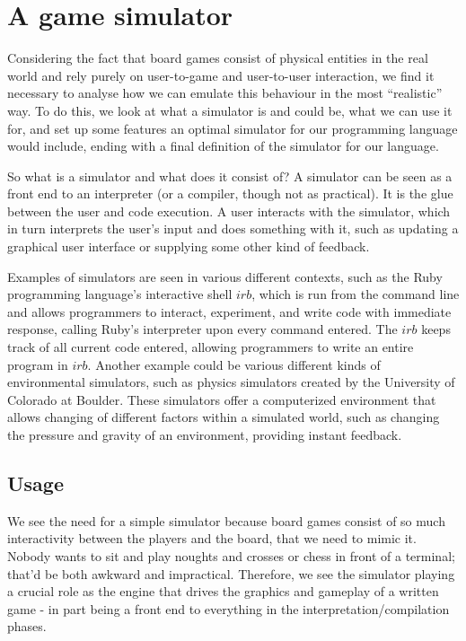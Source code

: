 \section{A game simulator}
\label{sec:simulator}
Considering the fact that board games consist of physical entities in the real
world and rely purely on user-to-game and user-to-user interaction, we find it
necessary to analyse how we can emulate this behaviour in the most ``realistic''
way. To do this, we look at what a simulator is and could be, what we can use it
for, and set up some features an optimal simulator for our programming language
would include, ending with a final definition of the simulator for our language.

So what is a simulator and what does it consist of? A simulator can be seen as a
front end to an interpreter (or a compiler, though not as practical). It is the
glue between the user and code execution. A user interacts with the simulator,
which in turn interprets the user's input and does something with it, such as
updating a graphical user interface or supplying some other kind of feedback.

Examples of simulators are seen in various different contexts, such as the
Ruby\cite{rubyLang} programming language's interactive shell $irb$, which is run
from the command line and allows programmers to interact, experiment, and write
code with immediate response, calling Ruby's interpreter upon every command
entered. The $irb$ keeps track of all current code entered, allowing programmers
to write an entire program in $irb$. Another example could be various different
kinds of environmental simulators, such as physics simulators created by the
University of Colorado at Boulder\cite{colSim}. These simulators offer a
computerized environment that allows changing of different factors within a
simulated world, such as changing the pressure and gravity of an environment,
providing instant feedback.

\subsection{Usage}
We see the need for a simple simulator because board games consist of so much
interactivity between the players and the board, that we need to mimic it.
Nobody wants to sit and play noughts and crosses or chess in front of a
terminal; that'd be both awkward and impractical. Therefore, we see the
simulator playing a crucial role as the engine that drives the graphics and
gameplay of a written game - in part being a front end to everything in the
interpretation/compilation phases.

